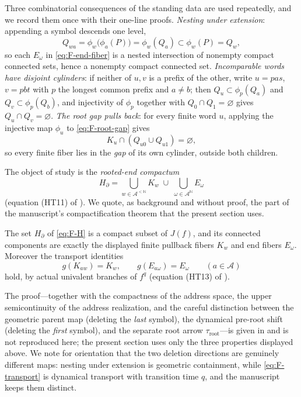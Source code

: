 Three combinatorial consequences of the standing data are used
repeatedly, and we record them once with their one-line proofs.
\emph{Nesting under extension}: appending a symbol descends one level,
\[
Q_{wa}=\phi_w\bigl(\phi_a(P)\bigr)=\phi_w(Q_a)\subset\phi_w(P)=Q_w ,
\]
so each $E_\omega$ in \eqref{eq:F-end-fiber} is a nested intersection of
nonempty compact connected sets, hence a nonempty compact connected set.
\emph{Incomparable words have disjoint cylinders}: if neither of $u,v$ is
a prefix of the other, write $u=pas$, $v=pbt$ with $p$ the longest common
prefix and $a\ne b$; then $Q_u\subset\phi_p(Q_a)$ and
$Q_v\subset\phi_p(Q_b)$, and injectivity of $\phi_p$ together with
$Q_0\cap Q_1=\varnothing$ gives $Q_u\cap Q_v=\varnothing$.
\emph{The root gap pulls back}: for every finite word $u$, applying the
injective map $\phi_u$ to \eqref{eq:F-root-gap} gives
\begin{equation}\label{eq:F-root-gap-pullback}
K_u\cap(Q_{u0}\cup Q_{u1})=\varnothing ,
\end{equation}
so every finite fiber lies in the \emph{gap} of its own cylinder, outside
both children.

The object of study is the \emph{rooted-end compactum}
\begin{equation}\label{eq:F-H}
H_\partial
=\bigcup_{w\in\mathcal A^{<\mathbb N}}K_w
\;\cup\;
\bigcup_{\omega\in\mathcal A^{\mathbb N}}E_\omega
\end{equation}
(equation (HT11) of \cite{MWman}).  We quote, as background and without
proof, the part of the manuscript's compactification theorem that the
present section uses.

\begin{theorem}\label{thm:F-compactification}
The set $H_\partial$ of \eqref{eq:F-H} is a compact subset of $J(f)$, and
its connected components are exactly the displayed finite pullback fibers
$K_w$ and end fibers $E_\omega$.  Moreover the transport identities
\begin{equation}\label{eq:F-transport}
g(K_{aw})=K_w,
\qquad
g(E_{a\omega})=E_\omega
\qquad(a\in\mathcal A)
\end{equation}
hold, by actual univalent branches of $f^{q}$ (equation (HT13) of
\cite{MWman}).
\end{theorem}

The proof---together with the compactness of the address space, the upper
semicontinuity of the address realization, and the careful distinction
between the geometric parent map (deleting the \emph{last} symbol), the
dynamical pre-root shift (deleting the \emph{first} symbol), and the
separate root arrow $\tau_{\mathrm{root}}$---is given in
\cite[Theorem~10.37]{MWman} and is not reproduced here; the present
section uses only the three properties displayed above.  We note for
orientation that the two deletion directions are genuinely different
maps: nesting under extension is geometric containment, while
\eqref{eq:F-transport} is dynamical transport with transition time $q$,
and the manuscript keeps them distinct.

